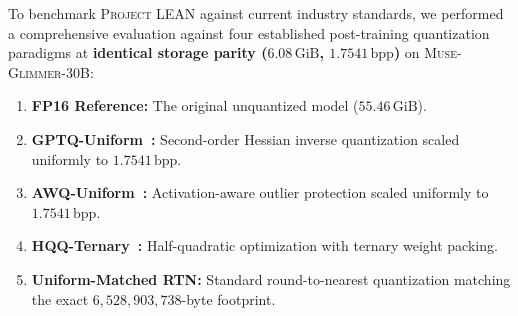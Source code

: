 \documentclass[10pt,twocolumn,letterpaper]{article}
\newcommand{\modelname}{\textsc{Muse-Glimmer-30B}}
\newcommand{\systemname}{\textsc{Project LEAN}}
\begin{document}
To benchmark \systemname{} against current industry standards, we performed a comprehensive evaluation against four established post-training quantization paradigms at \textbf{identical storage parity ($6.08\,\text{GiB}$, $1.7541\,\text{bpp}$)} on \modelname{}:
\begin{enumerate}[leftmargin=*]
    \item \textbf{FP16 Reference:} The original unquantized model ($55.46\,\text{GiB}$).
    \item \textbf{GPTQ-Uniform~\cite{frantar2022gptq}:} Second-order Hessian inverse quantization scaled uniformly to $1.7541\,\text{bpp}$.
    \item \textbf{AWQ-Uniform~\cite{lin2023awq}:} Activation-aware outlier protection scaled uniformly to $1.7541\,\text{bpp}$.
    \item \textbf{HQQ-Ternary~\cite{badri2023hqq}:} Half-quadratic optimization with ternary weight packing.
    \item \textbf{Uniform-Matched RTN:} Standard round-to-nearest quantization matching the exact $6,528,903,738$-byte footprint.
\end{enumerate}
\end{document}
